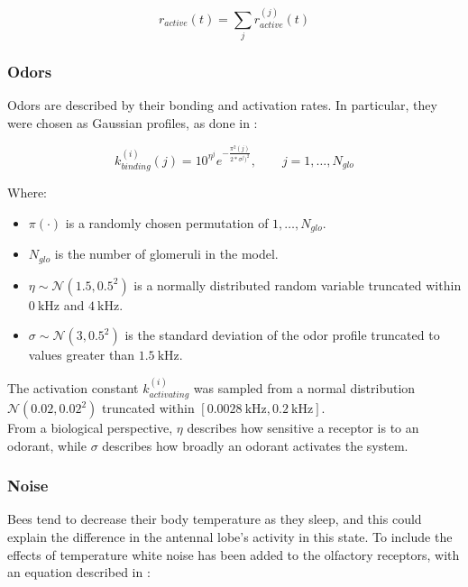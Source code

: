   \begin{equation}
    r_{active}(t) = \sum\limits_{j}r_{active}^{(j)}(t)
    \label{eqs:active-receptors}
  \end{equation}

    \subsubsection{Odors}
    \label{sec:odors}
    Odors are described by their bonding and activation rates.
    In particular, they were chosen as Gaussian profiles, as done in \cite{bee-geosmin}:

    \begin{equation}
      k_{binding}^{(i)}(j) = 10^{\eta^j}e^{-\frac{\pi^2(j)}{2*\sigma^j)^2}},\qquad j = 1, \dots, N_{glo}
    \end{equation}

    Where:

    \begin{multicols}{2}
      \begin{itemize}
        \item $\pi(\cdot)$ is a randomly chosen permutation of $1, \dots, N_{glo}$.
        \item $N_{glo}$ is the number of glomeruli in the model.
        \item $\eta\sim \mathcal{N}(1.5, 0.5^2)$ is a normally distributed random variable truncated within $\SI{0}{\kilo\hertz}$ and $\SI{4}{\kilo\hertz}$.
        \item $\sigma\sim\mathcal{N}(3, 0.5^2)$ is the standard deviation of the odor profile truncated to values greater than $\SI{1.5}{\kilo\hertz}$.
      \end{itemize}
    \end{multicols}

    The activation constant $k_{activating}^{(i)}$ was sampled from a normal distribution $\mathcal{N}(0.02, 0.02^2)$ truncated within $[\SI{0.0028}{\kilo\hertz}, \SI{0.2}{\kilo\hertz}]$.\\
    From a biological perspective, $\eta$ describes how sensitive a receptor is to an odorant, while $\sigma$ describes how broadly an odorant activates the system.

    \subsubsection{Noise}
    Bees tend to decrease their body temperature as they sleep, and this could explain the difference in the antennal lobe's activity in this state.
    To include the effects of temperature white noise has been added to the olfactory receptors, with an equation described in \cite{temperature}:


